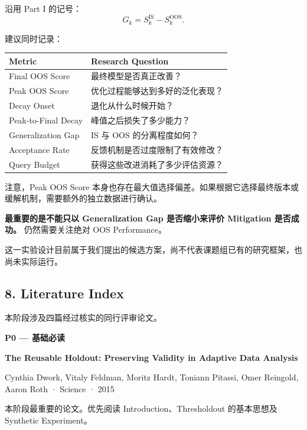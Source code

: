 沿用 Part I 的记号：
\[G_k=S_k^{\mathrm{IS}}-S_k^{\mathrm{OOS}}.\]

建议同时记录：

\begin{readertable}
\begin{longtable}[]{@{}
  >{\raggedright\arraybackslash}p{}
  >{\raggedright\arraybackslash}p{}@{}}
\toprule
Metric & Research Question \\
\midrule
\endhead
Final OOS Score & 最终模型是否真正改善？ \\
Peak OOS Score & 优化过程能够达到多好的泛化表现？ \\
Decay Onset & 退化从什么时候开始？ \\
Peak-to-Final Decay & 峰值之后损失了多少能力？ \\
Generalization Gap & IS 与 OOS 的分离程度如何？ \\
Acceptance Rate & 反馈机制是否过度限制了有效修改？ \\
Query Budget & 获得这些改进消耗了多少评估资源？ \\
\bottomrule
\end{longtable}
\end{readertable}

注意，Peak OOS Score 本身也存在最大值选择偏差。如果根据它选择最终版本或缓解机制，需要额外的独立数据进行确认。

\textbf{最重要的是不能只以 Generalization Gap 是否缩小来评价 Mitigation 是否成功。} 仍然需要关注绝对 OOS Performance。

这一实验设计目前属于我们提出的候选方案，尚不代表课题组已有的研究框架，也尚未实际运行。

\hypertarget{part-2-20-0001-literature-index}{%
\subsection{8. Literature Index}\label{part-2-20-0001-literature-index}}

本阶段涉及四篇经过核实的同行评审论文。

\textbf{P0 --- 基础必读}

\textbf{The Reusable Holdout: Preserving Validity in Adaptive Data Analysis}

Cynthia Dwork, Vitaly Feldman, Moritz Hardt, Toniann Pitassi, Omer Reingold, Aaron Roth · Science · 2015

本阶段最重要的论文。优先阅读 Introduction、Thresholdout 的基本思想及 Synthetic Experiment。

